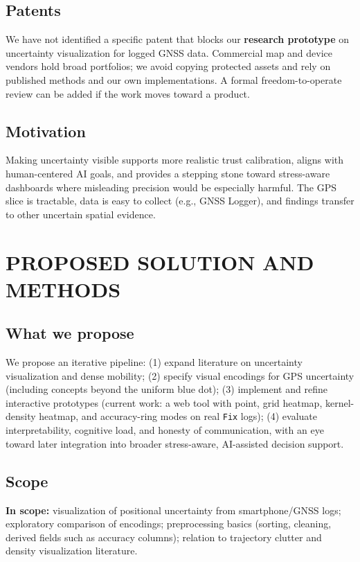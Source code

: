 \documentclass[12pt,a4paper]{article}
\begin{document}
\subsection*{Patents}

We have not identified a specific patent that blocks our \textbf{research prototype} on uncertainty visualization for logged GNSS data. Commercial map and device vendors hold broad portfolios; we avoid copying protected assets and rely on published methods and our own implementations. A formal freedom-to-operate review can be added if the work moves toward a product.

\subsection*{Motivation}

Making uncertainty visible supports more realistic trust calibration, aligns with human-centered AI goals, and provides a stepping stone toward stress-aware dashboards where misleading precision would be especially harmful. The GPS slice is tractable, data is easy to collect (e.g., GNSS Logger), and findings transfer to other uncertain spatial evidence.

\section{PROPOSED SOLUTION AND METHODS}

\subsection*{What we propose}

We propose an iterative pipeline: (1) expand literature on uncertainty visualization and dense mobility; (2) specify visual encodings for GPS uncertainty (including concepts beyond the uniform blue dot); (3) implement and refine interactive prototypes (current work: a web tool with point, grid heatmap, kernel-density heatmap, and accuracy-ring modes on real \texttt{Fix} logs); (4) evaluate interpretability, cognitive load, and honesty of communication, with an eye toward later integration into broader stress-aware, AI-assisted decision support.

\subsection*{Scope}

\textbf{In scope:} visualization of positional uncertainty from smartphone/GNSS logs; exploratory comparison of encodings; preprocessing basics (sorting, cleaning, derived fields such as accuracy columns); relation to trajectory clutter and density visualization literature.
\end{document}
